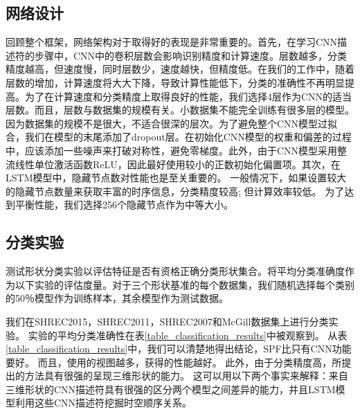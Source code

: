 \subsection{网络设计}
回顾整个框架，网络架构对于取得好的表现是非常重要的。首先，在学习CNN描述符的步骤中，CNN中的卷积层数会影响识别精度和计算速度。层数越多，分类精度越高，但速度慢，同时层数少，速度越快，但精度低。在我们的工作中，随着层数的增加，计算速度将大大下降，导致计算性能低下，分类的准确性不再明显提高。为了在计算速度和分类精度上取得良好的性能，我们选择4层作为CNN的适当层数。而且，层数与数据集的规模有关。小数据集不能完全训练有很多层的模型。因为数据集的规模不是很大，不适合很深的层次。为了避免整个CNN模型过拟合，我们在模型的末尾添加了dropout层。在初始化CNN模型的权重和偏差的过程中，应该添加一些噪声来打破对称性，避免零梯度。此外，由于CNN模型采用整流线性单位激活函数ReLU，因此最好使用较小的正数初始化偏置项。其次，在LSTM模型中，隐藏节点数对性能也是至关重要的。 一般情况下，如果设置较大的隐藏节点数量来获取丰富的时序信息，分类精度较高; 但计算效率较低。 为了达到平衡性能，我们选择256个隐藏节点作为中等大小。

\subsection{分类实验}
测试形状分类实验以评估特征是否有资格正确分类形状集合。将平均分类准确度作为以下实验的评估度量。对于三个形状基准的每个数据集，我们随机选择每个类别的50％模型作为训练样本，其余模型作为测试数据。

我们在SHREC2015，SHREC2011，SHREC2007和McGill数据集上进行分类实验。 实验的平均分类准确性在表\ref {table_classification_results}中被观察到。 从表\ref{table_classification_results}中，我们可以清楚地得出结论，SPF比只有CNN功能要好。 而且，使用的视图越多，获得的性能越好。 此外，由于分类精度高，所提出的方法具有很强的呈现三维形状的能力。 这可以用以下两个事实来解释：来自三维形状的CNN描述符具有很强的区分两个模型之间差异的能力，并且LSTM模型利用这些CNN描述符挖掘时空顺序关系。

